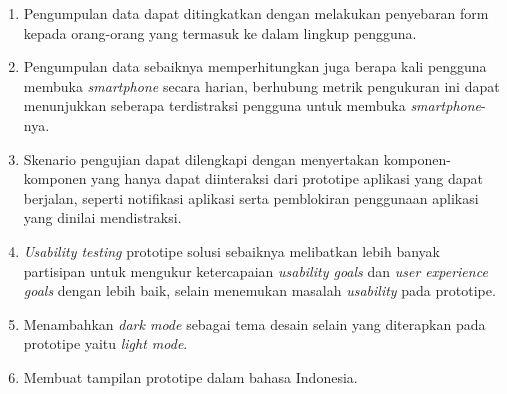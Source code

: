 \begin{enumerate}
  \item Pengumpulan data dapat ditingkatkan dengan melakukan penyebaran form kepada orang-orang yang termasuk ke dalam lingkup pengguna.
  
  \item Pengumpulan data sebaiknya memperhitungkan juga berapa kali pengguna membuka \textit{smartphone} secara harian, berhubung metrik pengukuran ini dapat menunjukkan seberapa terdistraksi pengguna untuk membuka \textit{smartphone}-nya.
  
  \item Skenario pengujian dapat dilengkapi dengan menyertakan komponen-komponen yang hanya dapat diinteraksi dari prototipe aplikasi yang dapat berjalan, seperti notifikasi aplikasi serta pemblokiran penggunaan aplikasi yang dinilai mendistraksi.
  
  \item \textit{Usability testing} prototipe solusi sebaiknya melibatkan lebih banyak partisipan untuk mengukur ketercapaian \textit{usability goals} dan \textit{user experience goals} dengan lebih baik, selain menemukan masalah \textit{usability} pada prototipe.
  
  \item Menambahkan \textit{dark mode} sebagai tema desain selain yang diterapkan pada prototipe yaitu \textit{light mode}.
  
  \item Membuat tampilan prototipe dalam bahasa Indonesia.
\end{enumerate}
